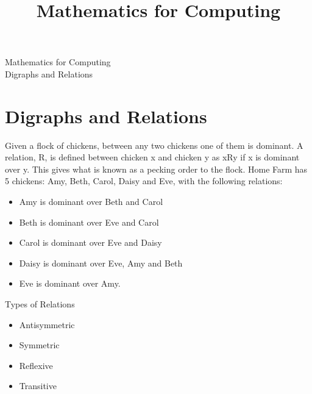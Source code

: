 \documentclass[12pt]{article}
\title{Mathematics for Computing}
\begin{document}
\begin{center}
\huge{Mathematics for Computing}\\
\LARGE{Digraphs and Relations}
\end{center}

\section{Digraphs and Relations}
Given a flock of chickens, between any two chickens one of them is
dominant. A relation, R, is defined between chicken x and chicken y as xRy if x is
dominant over y. This gives what is known as a pecking order to the flock. Home
Farm has 5 chickens: Amy, Beth, Carol, Daisy and Eve, with the following relations:

\begin{itemize}
\item Amy is dominant over Beth and Carol
\item Beth is dominant over Eve and Carol
\item Carol is dominant over Eve and Daisy
\item Daisy is dominant over Eve, Amy and Beth
\item Eve is dominant over Amy.
\end{itemize}

\newpage


Types of Relations

\begin{itemize}
\item Antisymmetric
\item Symmetric
\item Reflexive 
\item Transitive
\end{itemize}
\end{document}

